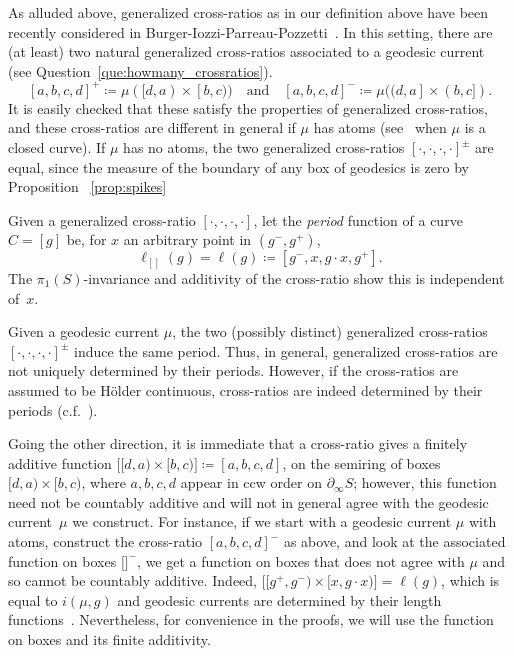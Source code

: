 \documentclass[11pt]{amsart}
\numberwithin{equation}{section}
\numberwithin{figure}{section}
\theoremstyle{definition}
\theoremstyle{plain}
\begin{document}
As alluded above, generalized cross-ratios as in our definition above have been recently considered in Burger-Iozzi-Parreau-Pozzetti~\cite{BIPP24:PositiveCrossratios}.
In this setting, there are (at least) two natural generalized cross-ratios associated to a geodesic current (see Question~\ref{que:howmany_crossratios}).
\[
[a,b,c,d]^+ \coloneqq \mu([d,a) \times [b,c))
\quad\text{and}\quad
[a,b,c,d]^- \coloneqq \mu((d,a] \times (b,c]).
\]
It is easily checked that these satisfy the properties of generalized cross-ratios,
and these cross-ratios are different in general if $\mu$ has atoms (see~\cite[Example~3.4]{BIPP24:PositiveCrossratios} when $\mu$ is a closed curve).
If $\mu$ has no atoms, the two generalized cross-ratios $[\cdot,\cdot,\cdot,\cdot]^{\pm}$ are equal, since the measure of the boundary of any box of geodesics is zero by Proposition~  \ref{prop:spikes}

Given a generalized cross-ratio $[ \cdot, \cdot, \cdot, \cdot ]$, let
the \emph{period} function of a curve $C=[g]$ be, for $x$ an arbitrary
point in $(g^-,g^+)$,
\[
  \ell_{[]}(g) = \ell(g) \coloneqq [g^-, x , g \cdot x, g^+].
\]
The $\pi_1(S)$-invariance and additivity of the cross-ratio show this is independent of~$x$.

Given a geodesic current $\mu$, the two (possibly distinct)
generalized cross-ratios $[ \cdot, \cdot, \cdot, \cdot ]^{\pm}$ induce
the same period. Thus, in general, generalized cross-ratios are not
uniquely determined by their periods. However, if the cross-ratios are
assumed to be H\"older continuous, cross-ratios are indeed determined
by their periods \cite[Theorem 1.f]{L95:BordDesVar} (c.f.\
\cite{Ot92:Symplectique}).

Going the other direction, it is immediate that a cross-ratio gives a
finitely additive function $\bigl[[d,a) \times [b,c)\bigr]\coloneqq [a,b,c,d]$, on the semiring of boxes $[d,a) \times [b,c)$, where $a,b,c,d$ appear in ccw
order on $\partial_\infty S$; however, this function need not be countably additive and will
not in general agree with the geodesic current~$\mu$ we construct. For
instance, if we start with a geodesic current $\mu$ with atoms,
construct the cross-ratio $[a,b,c,d]^-$ as above, and look at the
associated function on boxes $\bigl[ \bigr]^-$, we get a function on boxes that
does not agree with $\mu$ and so cannot be countably additive. Indeed,
 $\bigl[[g^+,g^-)\times [x,g \cdot x)\bigr]=\ell(g)$, which is equal to $i(\mu,g)$ and geodesic
currents are determined by their length functions~\cite{Otal90:SpectreMarqueNegative}. Nevertheless, for
convenience in the proofs, we will use the function on boxes and its finite additivity.
\end{document}
